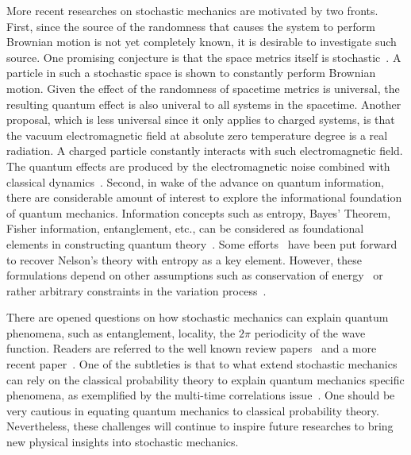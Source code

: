 \documentclass[%
 aip, 
 amsmath,amssymb,amsthm,
 nofootinbib,
 reprint,
]{revtex4-1}
\begin{document}
More recent researches on stochastic mechanics are motivated by two fronts. First, since the source of the randomness that causes the system to perform Brownian motion is not yet completely known, it is desirable to investigate such source. One promising conjecture is that the space metrics itself is stochastic~\cite{Santos,Kurihara}. A particle in such a stochastic space is shown to constantly perform Brownian motion. Given the effect of the randomness of spacetime metrics is universal, the resulting quantum effect is also univeral to all systems in the spacetime. Another proposal, which is less universal since it only applies to charged systems, is that the vacuum electromagnetic field at absolute zero temperature degree is a real radiation. A charged particle constantly interacts with such electromagnetic field. The quantum effects are produced by the electromagnetic noise combined with classical dynamics~\cite{Pena2, Santos2}. Second, in wake of the advance on quantum information, there are considerable amount of interest to explore the informational foundation of quantum mechanics. Information concepts such as entropy, Bayes' Theorem, Fisher information, entanglement, etc., can be considered as foundational elements in constructing quantum theory~\cite{Fuchs, Fuchs02, Frieden, Reginatto, Parwani, Hoehn2014, Yang2017}. Some efforts~\cite{Caticha, Pavon} have been put forward to recover Nelson's theory with entropy as a key element. However, these formulations depend on other assumptions such as conservation of energy~\cite{Caticha} or rather arbitrary constraints in the variation process~\cite{Pavon}.

There are opened questions on how stochastic mechanics can explain quantum phenomena, such as entanglement, locality, the $2\pi$ periodicity of the wave function. Readers are referred to the well known review papers~\cite{Goldstein, Nelson2} and a more recent paper~\cite{Kuipers}. One of the subtleties is that to what extend stochastic mechanics can rely on the classical probability theory to explain quantum mechanics specific phenomena, as exemplified by the multi-time correlations issue~\cite{Grabert, Blanchard}. One should be very cautious in equating quantum mechanics to classical probability theory. Nevertheless, these challenges will continue to inspire future researches to bring new physical insights into stochastic mechanics.
\end{document}
